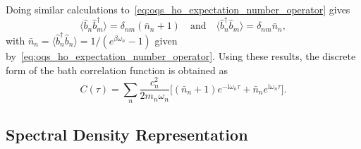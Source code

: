 Doing similar calculations to~\autoref{eq:oqs_ho_expectation_number_operator} gives
\begin{equation*}
	\langle \hat{b}_n \hat{b}_m^{\dagger} \rangle = \delta_{nm}(\bar{n}_n+1) \quad \text{and} \quad \langle \hat{b}_n^{\dagger} \hat{b}_m \rangle = \delta_{nm}\bar{n}_n,
\end{equation*}
with \(\bar{n}_n = \langle \hat{b}_n^{\dagger} \hat{b}_n \rangle = 1/(e^{\beta \omega_n}-1)\) given by~\autoref{eq:oqs_ho_expectation_number_operator}. Using these results, the discrete form of the bath correlation function is obtained as
\begin{equation*}
	C(\tau) = \sum_{n} \frac{c_n^2}{2 m_n \omega_n} \Big[(\bar{n}_n+1) e^{-\mathrm{i} \omega_n \tau} + \bar{n}_n e^{\mathrm{i} \omega_n \tau}\Big].
\end{equation*}


\subsection{Spectral Density Representation}
\label{subsec:oqs_ho_spectral_density}

